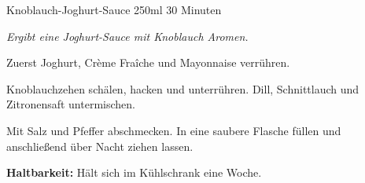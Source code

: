 \begin{recipe}{Knoblauch-Joghurt-Sauce} {250ml} {30 Minuten}

\freeform
\textit{Ergibt eine Joghurt-Sauce mit Knoblauch Aromen.}


Zuerst Joghurt, Crème Fraîche und Mayonnaise verrühren.


Knoblauchzehen schälen, hacken und unterrühren.
Dill, Schnittlauch und Zitronensaft untermischen.


Mit Salz und Pfeffer abschmecken.
In eine saubere Flasche füllen und anschließend über Nacht ziehen lassen.

\freeform
\hrulefill

\freeform 
\textbf{Haltbarkeit:}
Hält sich im Kühlschrank eine Woche.

\end{recipe}
